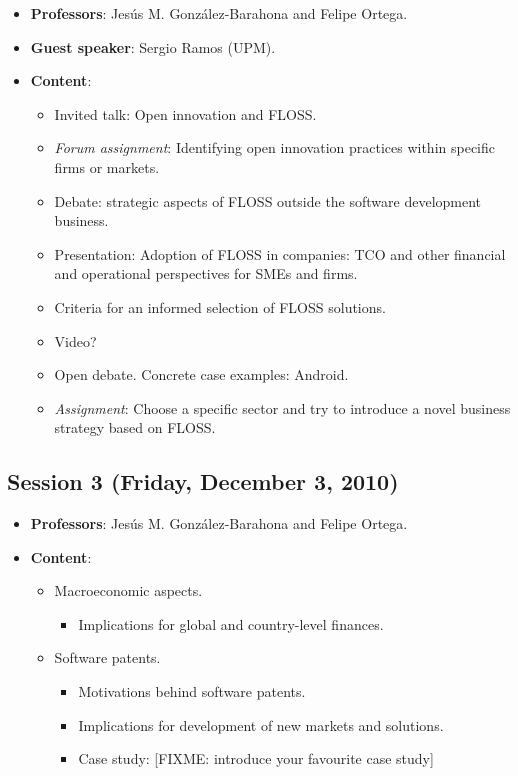 \documentclass[a4paper]{article}
\begin{document}
\begin{itemize}
 \item \textbf{Professors}: Jesús M. González-Barahona and Felipe Ortega.
 \item \textbf{Guest speaker}: Sergio Ramos (UPM).

 \item \textbf{Content}:

    \begin{itemize}
     \item Invited talk: Open innovation and FLOSS.
     \item \textit{Forum assignment}: Identifying open innovation practices within specific firms or markets.

     \item Debate: strategic aspects of FLOSS outside the software development business.
        \item Presentation: Adoption of FLOSS in companies: TCO and other financial and 
	operational perspectives for SMEs and firms.
	\item Criteria for an informed selection of FLOSS solutions.
	\item Video?
	\item Open debate. Concrete case examples: Android.
        \item \textit{Assignment}: Choose a specific sector and try to introduce a novel business strategy
	based on FLOSS.
    \end{itemize}

\end{itemize}

\subsection{Session 3 (Friday, December 3, 2010)}

\begin{itemize}
 \item \textbf{Professors}: Jesús M. González-Barahona and Felipe Ortega.

 \item \textbf{Content}:

    \begin{itemize}
     \item Macroeconomic aspects.
      \begin{itemize}
       \item Implications for global and country-level finances.
       
      \end{itemize}

     \item Software patents.
	\begin{itemize}
	 \item Motivations behind software patents.
	 \item Implications for development of new markets and solutions.
         \item Case study: [FIXME: introduce your favourite case study]
	\end{itemize}

    \end{itemize}

\end{itemize}
\end{document}
